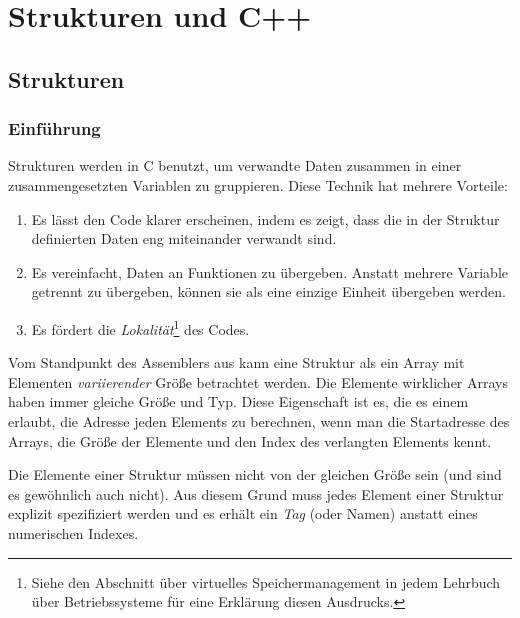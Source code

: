 \chapter{Strukturen und C++}

\section{Strukturen }

\subsection{Einf\"{u}hrung}

Strukturen werden in C benutzt, um verwandte Daten zusammen in einer
zusammengesetzten Variablen zu gruppieren. Diese Technik hat mehrere
Vorteile:
\begin{enumerate}
\parskip=-0.25em %

\item
Es l\"{a}sst den Code klarer erscheinen, indem es zeigt, dass die in der
Struktur definierten Daten eng miteinander verwandt sind.

\item
Es vereinfacht, Daten an Funktionen zu \"{u}bergeben. Anstatt mehrere
Variable getrennt zu \"{u}bergeben, k\"{o}nnen sie als eine einzige Einheit
\"{u}bergeben werden.

\item
Es f\"{o}rdert die  \emph{Lokalit\"{a}t}\footnote{Siehe den
Abschnitt \"{u}ber virtuelles Speichermanagement in jedem Lehrbuch \"{u}ber
Betriebssysteme f\"{u}r eine Erkl\"{a}rung diesen Ausdrucks.} des Codes.
\end{enumerate}

Vom Standpunkt des Assemblers aus kann eine Struktur als ein Array
mit Elementen \emph{variierender} Gr\"{o}{\ss}e betrachtet werden. Die
Elemente wirklicher Arrays haben immer gleiche Gr\"{o}{\ss}e und Typ. Diese
Eigenschaft ist es, die es einem erlaubt, die Adresse jeden Elements
zu berechnen, wenn man die Startadresse des Arrays, die Gr\"{o}{\ss}e der
Elemente und den Index des verlangten Elements kennt.

Die Elemente einer Struktur m\"{u}ssen nicht von der gleichen Gr\"{o}{\ss}e sein
(und sind es gew\"{o}hnlich auch nicht). Aus diesem Grund muss jedes
Element einer Struktur explizit spezifiziert werden und es erh\"{a}lt
ein \emph{Tag} (oder Namen) anstatt eines numerischen Indexes.

